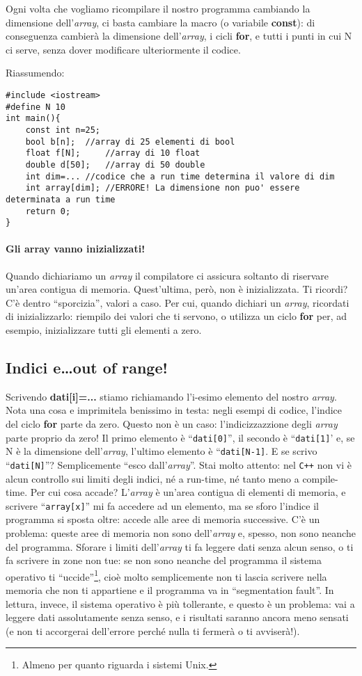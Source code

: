 Ogni volta che vogliamo ricompilare il nostro programma cambiando la dimensione dell'\emph{array}, ci basta cambiare la macro (o variabile \textbf{const}): di conseguenza cambierà la dimensione dell'\emph{array}, i cicli \textbf{for}, e tutti i punti in cui N ci serve, senza dover modificare ulteriormente il codice.

Riassumendo:
\begin{lstlisting}
#include <iostream>
#define N 10
int main(){
	const int n=25;
	bool b[n]; 	//array di 25 elementi di bool
	float f[N]; 	//array di 10 float
	double d[50];	//array di 50 double
	int dim=...	//codice che a run time determina il valore di dim
	int array[dim];	//ERRORE! La dimensione non puo' essere determinata a run time
	return 0;
}
\end{lstlisting}
\paragraph{Gli array vanno inizializzati!} Quando dichiariamo un \emph{array} il compilatore ci assicura soltanto di riservare un'area contigua di memoria. Quest'ultima, però, non è inizializzata. Ti ricordi? C'è dentro ``sporcizia'', valori a caso. Per cui, quando dichiari un \emph{array}, ricordati di inizializzarlo: riempilo dei valori che ti servono, o utilizza un ciclo \textbf{for} per, ad esempio, inizializzare tutti gli elementi a zero. 
\subsection{Indici e\ldots out of range!}
Scrivendo \textbf{dati[i]=...} stiamo richiamando l'i-esimo elemento del nostro \emph{array}. Nota una cosa e imprimitela benissimo in testa: negli esempi di codice, l'indice del ciclo \textbf{for} parte da zero. Questo non è un caso: l'indicizzazzione degli \emph{array} parte proprio da zero! Il primo elemento è ``\verb|dati[0]|'', il secondo è ``\verb|dati[1]|'  e, se N è la dimensione dell'\emph{array}, l'ultimo elemento è ``\verb|dati[N-1]|. E se scrivo ``\verb|dati[N]|''? Semplicemente ``esco dall'\emph{array}''. Stai molto attento: nel \verb|C++| non vi è alcun controllo sui limiti degli indici, né a run-time, né tanto meno a compile-time. Per cui cosa accade? L'\emph{array} è un'area contigua di elementi di memoria, e scrivere ``\verb|array[x]|'' mi fa accedere ad un elemento, ma se sforo l'indice il programma si sposta oltre: accede alle aree di memoria successive. C'è un problema: queste aree di memoria non sono dell'\emph{array} e, spesso, non sono neanche del programma. Sforare i limiti dell'\emph{array} ti fa leggere dati senza alcun senso, o ti fa scrivere in zone non tue: se non sono neanche del programma il sistema operativo ti ``uccide''\footnote{Almeno per quanto riguarda i sistemi Unix.}, cioè molto semplicemente non ti lascia scrivere nella memoria che non ti appartiene e il programma va in ``segmentation fault''. In lettura, invece, il sistema operativo è più tollerante, e questo è un problema: vai a leggere dati assolutamente senza senso, e i risultati saranno ancora meno sensati (e non ti accorgerai dell'errore perché nulla ti fermerà o ti avviserà!). 


